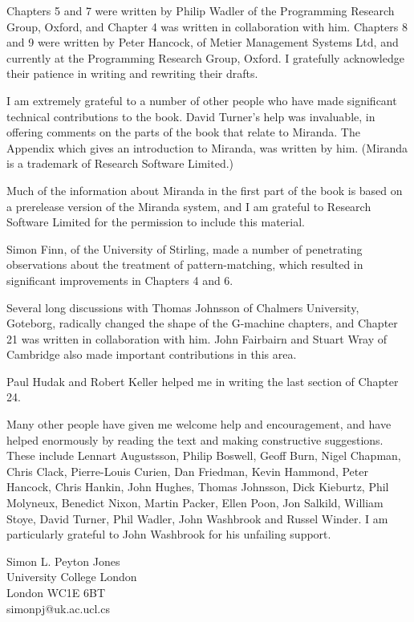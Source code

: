 Chapters 5 and 7 were written by Philip Wadler of the Programming
Research Group, Oxford, and Chapter 4 was written in collaboration with
him. Chapters 8 and 9 were written by Peter Hancock, of Metier Management
Systems Ltd, and currently at the Programming Research Group, Oxford. I
gratefully acknowledge their patience in writing and rewriting their drafts.

I am extremely grateful to a number of other people who have made
significant technical contributions to the book. David Turner's help was
invaluable, in offering comments on the parts of the book that relate to
Miranda. The Appendix which gives an introduction to Miranda, was written
by him. (Miranda is a trademark of Research Software Limited.)

Much of the information about Miranda in the first part of the book is based
on a prerelease version of the Miranda system, and I am grateful to Research
Software Limited for the permission to include this material.

Simon Finn, of the University of Stirling, made a number of penetrating
observations about the treatment of pattern-matching, which resulted in
significant improvements in Chapters 4 and 6.

Several long discussions with Thomas Johnsson of Chalmers University,
Goteborg, radically changed the shape of the G-machine chapters, and
Chapter 21 was written in collaboration with him. John Fairbairn and Stuart
Wray of Cambridge also made important contributions in this area.

Paul Hudak and Robert Keller helped me in writing the last section of
Chapter 24.

Many other people have given me welcome help and encouragement, and
have helped enormously by reading the text and making constructive
suggestions. These include Lennart Augustsson, Philip Boswell, Geoff Burn,
Nigel Chapman, Chris Clack, Pierre-Louis Curien, Dan Friedman, Kevin
Hammond, Peter Hancock, Chris Hankin, John Hughes, Thomas Johnsson,
Dick Kieburtz, Phil Molyneux, Benedict Nixon, Martin Packer, Ellen Poon,
Jon Salkild, William Stoye, David Turner, Phil Wadler, John Washbrook and
Russel Winder. I am particularly grateful to John Washbrook for his unfailing
support.

\vspace{-\baselineskip}
\begin{flushright}
Simon L. Peyton Jones\\
University College London\\
London WC1E 6BT\\
simonpj@uk.ac.ucl.cs
\end{flushright}

